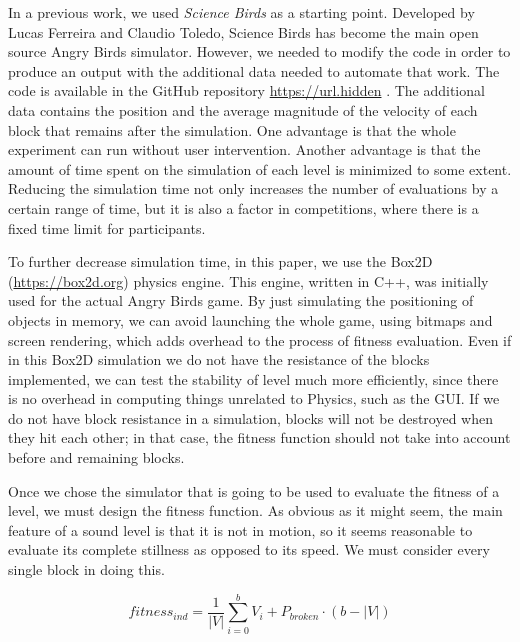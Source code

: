 \documentclass[a4paper,twoside]{article}
\begin{document}
In a previous work, we used {\em Science Birds}
\cite{ferreira2014search}  as a starting point. Developed by Lucas
Ferreira and Claudio Toledo, Science Birds has become the main open
source Angry Birds simulator. However, we needed to modify the code in
order to produce an output with the additional data needed to automate
that work. The code is available in the GitHub repository
\url{https://url.hidden}
. The additional data
contains the position and the average magnitude of the velocity of
each block that remains after the simulation. One advantage is that
the whole experiment can run without user intervention. Another
advantage is that the amount of time spent on the simulation of each
level is minimized to some extent.  Reducing the simulation time not
only increases the number of evaluations by a certain range of time,
but it is also a factor in competitions, where there is a fixed time
limit for participants. 


To further decrease simulation time, in this paper, we use the Box2D (\url{https://box2d.org}) physics engine. This engine, written in C++, was initially used for the actual Angry Birds game. By just simulating the positioning of objects in memory, we can avoid launching the whole game, using bitmaps and screen rendering, which adds overhead to the process of fitness evaluation. Even if in this Box2D simulation we do not have the resistance of the blocks implemented, we can test the stability of level much more efficiently, since there is no overhead in computing things unrelated to Physics, such as the GUI. If we do not have block resistance in a simulation, blocks will not be destroyed when they hit each other; in that case, the fitness function should not take into account before and remaining blocks.


Once we chose the simulator that is going to be used to evaluate the fitness of a level, we must design the fitness function. As obvious as it might seem, the main feature of a sound level is that it is not in motion, so it seems reasonable to evaluate its complete stillness as opposed to its speed. We must consider every single block in doing this. 

$$fitness_{ind} = \frac{1}{|V|}\sum_{i=0}^{b}{V_i} + P_{broken}\cdot(b-|V|)$$
\end{document}
